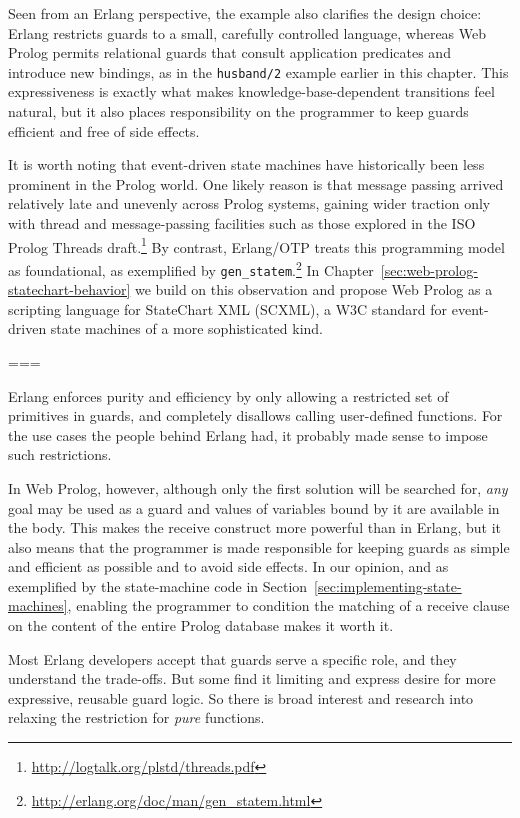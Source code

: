 Seen from an Erlang perspective, the example also clarifies the design choice: Erlang restricts guards to a small, carefully controlled language, whereas Web Prolog permits relational guards that consult application predicates and introduce new bindings, as in the \texttt{husband/2} example earlier in this chapter. This expressiveness is exactly what makes knowledge-base-dependent transitions feel natural, but it also places responsibility on the programmer to keep guards efficient and free of side effects.

It is worth noting that event-driven state machines have historically been less prominent in the Prolog world. One likely reason is that message passing arrived relatively late and unevenly across Prolog systems, gaining wider traction only with thread and message-passing facilities such as those explored in the ISO Prolog Threads draft.\footnote{\url{http://logtalk.org/plstd/threads.pdf}} By contrast, Erlang/OTP treats this programming model as foundational, as exemplified by \texttt{gen\_statem}.\footnote{\url{http://erlang.org/doc/man/gen\_statem.html}} In Chapter~\ref{sec:web-prolog-statechart-behavior} we build on this observation and propose Web Prolog as a scripting language for StateChart XML (SCXML), a W3C standard for event-driven state machines of a more sophisticated kind.

===

Erlang enforces purity and efficiency by only allowing a restricted set of primitives in guards, and completely disallows calling user-defined functions. For the use cases the people behind Erlang had, it probably made sense to impose such restrictions. 

In Web Prolog, however, although only the first solution will be searched for, \textit{any} goal may be used as a guard and values of variables bound by it are available in the body. This makes the receive construct more powerful than in Erlang, but it also means that the programmer is made responsible for keeping guards as simple and efficient as possible and to avoid side effects. In our opinion, and as exemplified by the state-machine code in Section~\ref{sec:implementing-state-machines}, enabling the programmer to condition the matching of a receive clause on the content of the entire Prolog database makes it worth it. 

Most Erlang developers accept that guards serve a specific role, and they understand the trade-offs. But some find it limiting and express desire for more expressive, reusable guard logic. So there is broad interest and research into relaxing the restriction for \textit{pure} functions.

